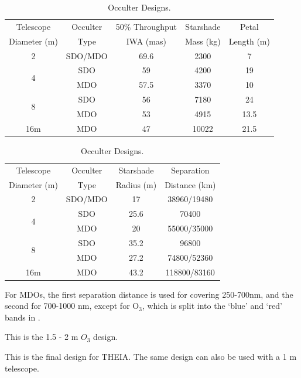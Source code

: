 \begin{table}[ht]
\caption{Occulter Designs. \label{table:occulters}}
\begin{center}
\begin{tabular}{ c c c c c }
\hline\hline
Telescope & Occulter &  50\% Throughput & Starshade & Petal\\
 Diameter  (m) & Type &  IWA (mas) & Mass (kg) & Length (m)\\
\hline
2 & SDO/MDO\tnote{\textasteriskcentered} & 69.6 & 2300 & 7\\
\hline
\multirow{2}{*}{4} & SDO  & 59 & 4200 & 19\\
			       &  MDO\tnote{\textdaggerdbl} & 57.5 & 3370 & 10\\
			       \hline
\multirow{2}{*}{8} & SDO & 56 & 7180 & 24\\
			       &  MDO  & 53 & 4915 & 13.5\\
			       \hline
16m & MDO & 47 & 10022 & 21.5\\		       
\hline
\end{tabular}

\medskip

\begin{threeparttable}[b]
\begin{tabular}{ c c c c }
\hline\hline
Telescope & Occulter & Starshade & Separation\\
 Diameter  (m) & Type &  Radius (m) & Distance (km)\tnote{\textdagger} \\
\hline
2 & SDO/MDO\tnote{\textasteriskcentered} & 17 & 38960/19480 \\
\hline
\multirow{2}{*}{4} & SDO & 25.6 & 70400 \\
			       &  MDO\tnote{\textdaggerdbl} & 20 & 55000/35000 \\
			       \hline
\multirow{2}{*}{8} & SDO & 35.2 & 96800\\
			       &  MDO & 27.2 & 74800/52360 \\
			       \hline
16m & MDO & 43.2 & 118800/83160 \\		       
\hline
\end{tabular}
\begin{tablenotes}
  \item [\textdagger] For MDOs, the first separation distance is used for covering 250-700nm, and the second for 700-1000 nm, except for O$_3$, which is split into the `blue' and `red' bands in .
    \item [\textasteriskcentered] This is the 1.5 - 2 m $O_3$ design.
    \item [\textdaggerdbl] This is the final design for THEIA.  The same design can also be used with a 1 m telescope.
   \end{tablenotes}
 \end{threeparttable}
 
 \end{center}
\end{table}

